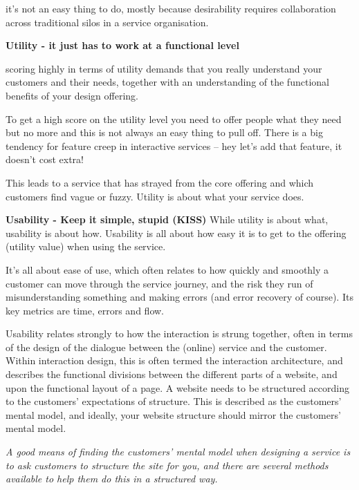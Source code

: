 it’s not an easy thing to do, mostly because desirability requires collaboration across traditional silos in a service organisation.

\textbf{Utility - it just has to work at a functional level}

scoring highly in terms of utility demands that you really understand your customers and their needs, together with an understanding of the functional benefits of your design offering.

To get a high score on the utility level you need to offer people what they need but no more and this is not always an easy thing to pull off. There is a big tendency for feature creep in interactive services – hey let’s add that feature, it doesn’t cost extra!

This leads to a service that has strayed from the core offering and which customers find vague or fuzzy. Utility is about what your service does.

\textbf{Usability - Keep it simple, stupid (KISS)}
While utility is about what, usability is about how. Usability is all about how easy it is to get to the offering (utility value) when using the service.

It’s all about ease of use, which often relates to how quickly and smoothly a customer can move through the service journey, and the risk they run of misunderstanding something and making errors (and error recovery of course). Its key metrics are time, errors and flow.


Usability relates strongly to how the interaction is strung together, often in terms of the design of the dialogue between the (online) service and the customer. Within interaction design, this is often termed the interaction architecture, and describes the functional divisions between the different parts of a website, and upon the functional layout of a page. A website needs to be structured according to the customers’ expectations of structure. This is described as the customers’ mental model, and ideally, your website structure should mirror the customers’ mental model.

\textit{A good means of finding the customers’ mental model when designing a service is to ask customers to structure the site for you, and there are several methods available to help them do this in a structured way.}

